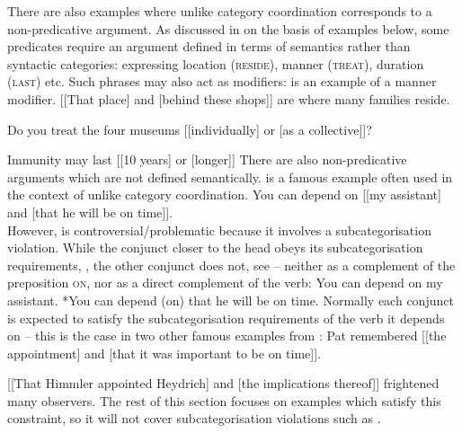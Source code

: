 \documentclass[output=paper]{../langscibook}
\begin{document}
There are also examples where unlike category coordination corresponds
to a non-predicative argument. As discussed in \citet{pat:prz:23:li}
on the basis of examples below, some predicates require an argument
defined in terms of semantics rather than syntactic categories:
expressing location (\textsc{reside}), manner (\textsc{treat}),
duration (\textsc{last}) etc.
%
Such phrases may also act as modifiers: 
is an example of a manner modifier.
\ea\label{ex:pat:prz:21:20:loc:np:pp} [[That place] and [behind these shops]] are where many families reside.
  \item\label{ex:pat:prz:21:10:mann:advp:pp} Do you treat the four museums [[individually] or [as a collective]]?
  \item\label{ex:pat:prz:21:22:dur:np:advp} Immunity may last [[10 years] or [longer]]
\z
There are also non-predicative
arguments which are not defined semantically.
 is a famous example often used in the
context of unlike category coordination.
\ea\label{ex:sag:etal:85:124b} You can depend on [[my assistant] and [that he will be on time]].\\ \hspace*{\fill} \citep[165, (124b)]{sag:etal:85}
\z
However,  is controversial/problematic because it involves a subcategorisation
violation. While the conjunct closer to the head obeys its
subcategorisation requirements,
, the other conjunct does not, see
 – neither as a complement of the
preposition \textsc{on}, nor as a direct complement of the verb:
\ea\label{ex:sag:etal:85:124b:1:OK} You can depend on my assistant.\z
\ea\label{ex:sag:etal:85:124b:2:bad} *You can depend (on) that he will be on time.\z
Normally each conjunct is expected to satisfy the subcategorisation
requirements of the verb it depends on – this is the case in two other
famous examples from \citet{sag:etal:85}:
\ea\label{ex:sag:etal:85:123a} Pat remembered [[the appointment] and [that it was important to be on time]]. \hspace*{\fill} \citep[165, (123a)]{sag:etal:85}
  \item\label{ex:sag:etal:85:123b} [[That Himmler appointed Heydrich] and [the implications thereof]] frightened many observers. \hfill\citep[165, (123b)]{sag:etal:85}
\z
The rest of this section focuses on examples which satisfy this
constraint, so it will not cover subcategorisation violations such as .
\end{document}
